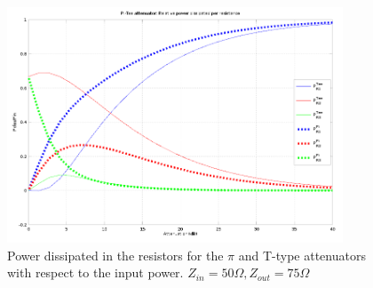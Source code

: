      \begin{figure}[ht]
    \centering
    \includegraphics[width=10cm]{./images/pi-tee-relative-power-dissipation-50-75-Ohm.png}
    \caption{Power dissipated in the resistors for the $\pi$ and T-type attenuators with respect to the input power. $Z_{in} = 50 \Omega, Z_{out} = 75 \Omega$}
    \label{fig:pi-tee-relative-power-dissipation-50-75-Ohm}
  \end{figure}